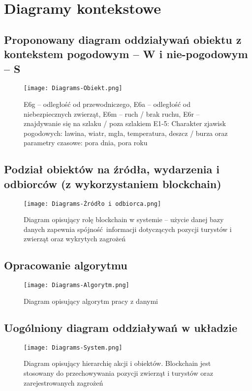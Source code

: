 \documentclass{article}
\begin{document}
\section{Diagramy kontekstowe} 


\subsection{Proponowany diagram oddziaływań obiektu z kontekstem pogodowym -- W i nie-pogodowym -- S}
\begin{figure}[!htb]
\centering
\texttt{[image: Diagrams-Obiekt.png]}
\caption{E6g -- odległość od przewodniczego, E6a -- odległość od niebezpiecznych zwierząt, E6m -- ruch / brak ruchu, E6r -- znajdywanie się na szlaku / poza szlakiem \hspace{\textwidth} E1-5: Charakter zjawisk pogodowych: lawina, wiatr, mgła, temperatura, deszcz / burza oraz parametry czasowe: pora dnia, pora roku}
\end{figure}
\FloatBarrier
\clearpage
\subsection{Podział obiektów na źródła, wydarzenia i odbiorców (z wykorzystaniem blockchain)}
\begin{figure}[!htb]
\centering
\texttt{[image: Diagrams-Źródło i odbiorca.png]}
\caption{Diagram opisujący rolę blockchain w systemie -- użycie danej bazy danych zapewnia spójność informacji dotyczących pozycji turystów i zwierząt oraz wykrytych zagrożeń}
\end{figure}
\FloatBarrier


\subsection{Opracowanie algorytmu}
\begin{figure}[!htb]
\centering
\texttt{[image: Diagrams-Algorytm.png]}
\caption{Diagram opisujący algorytm pracy z danymi}
\end{figure}
\FloatBarrier
\clearpage

\subsection{Uogólniony diagram oddziaływań w układzie}
\begin{figure}[!htb]
\centering
\texttt{[image: Diagrams-System.png]}
\caption{Diagram opisujący hierarchię akcji i obiektów. Blockchain jest stosowany do przechowywania pozycji zwierząt i turystów oraz zarejestrowanych zagrożeń}
\end{figure}
\FloatBarrier
\end{document}

